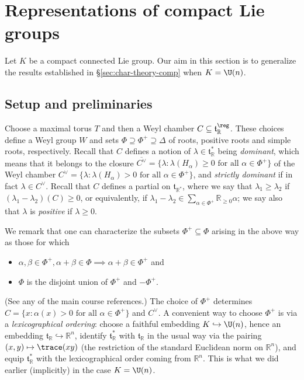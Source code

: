 \documentclass[reqno]{amsart} 
\begin{document}
\section{Representations of compact Lie groups}\label{sec:repr-comp-lie}
Let $K$ be a compact connected Lie group.  Our aim in this section is to generalize the results established in \S\ref{sec:char-theory-comp} when $K = \U(n)$.

\subsection{Setup and preliminaries}
Choose a maximal torus $T$ and then a Weyl chamber $C \subseteq \mathfrak{t}_{\mathbb{R}}^{\reg}$.  These choices define a Weyl group $W$ and sets $\Phi \supseteq \Phi^+ \supseteq \Delta$ of roots, positive roots and simple roots, respectively.  Recall that $C$ defines a notion of $\lambda \in \mathfrak{t}_{\mathbb{R}}^*$ being \emph{dominant}, which means that it belongs to the closure $\overline{C^\vee } = \{\lambda : \lambda(H_\alpha) \geq 0 \text{ for all } \alpha \in \Phi^+\}$ of the Weyl chamber $C^\vee = \{\lambda : \lambda(H_\alpha) > 0 \text{ for all } \alpha \in \Phi^+\}$, and \emph{strictly dominant} if in fact $\lambda \in C^\vee$.  Recall that $C$ defines a partial on $\mathfrak{t}_{\mathbb{R}^*}$, where we say that $\lambda_1 \geq \lambda_2$ if $(\lambda_1 - \lambda_2)(C) \geq 0$, or equivalently, if $\lambda_1 - \lambda_2 \in \sum_{\alpha \in \Phi^+} \mathbb{R}_{\geq 0} \alpha$; we say also that $\lambda$ is \emph{positive} if $\lambda \geq 0$.

We remark that one can characterize the subsets $\Phi^+ \subseteq \Phi$ arising in the above way as those for which
\begin{itemize}
\item $\alpha, \beta \in \Phi^+, \alpha + \beta \in \Phi \implies \alpha+\beta \in \Phi^+$ and
\item $\Phi$ is the disjoint union of $\Phi^+$ and $- \Phi^+$.
\end{itemize}
(See any of the main course references.)  The choice of $\Phi^+$ determines $C = \{x : \alpha(x) > 0 \text{ for all } \alpha \in \Phi^+ \}$ and $C^\vee$.  A convenient way to choose $\Phi^+$ is via a \emph{lexicographical ordering}: choose a faithful embedding $K \hookrightarrow \U(n)$, hence an embedding $\mathfrak{t}_{\mathbb{R}} \hookrightarrow \mathbb{R}^n$, identify $\mathfrak{t}_{\mathbb{R}}^*$ with $\mathfrak{t}_{\mathbb{R}}$ in the usual way via the pairing $(x,y) \mapsto \trace(x y)$ (the restriction of the standard Euclidean norm on $\mathbb{R}^n$), and equip $\mathfrak{t}_{\mathbb{R}}^*$ with the lexicographical order coming from $\mathbb{R}^n$.  This is what we did earlier (implicitly) in the case $K = \U(n)$.
\end{document}
